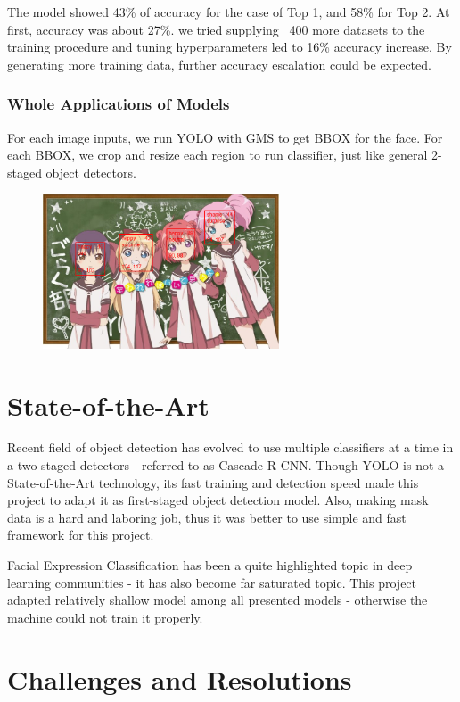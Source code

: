 \documentclass{article}
\begin{document}
The model showed 43\% of accuracy for the case of Top 1, and 58\% for Top 2. At
first, accuracy was about 27\%. we tried supplying ~400 more datasets to the
training procedure and tuning hyperparameters led to 16\% accuracy increase. By
generating more training data, further accuracy escalation could be expected.

\subsubsection{Whole Applications of Models}
For each image inputs, we run YOLO with GMS to get BBOX for the face. For each
BBOX, we crop and resize each region to run classifier, just like general
2-staged object detectors.

\begin{figure}[h]
  \centering
  \includegraphics[width=7cm]{image/yolo_class_example.png}
\end{figure}

\section{State-of-the-Art}
Recent field of object detection has evolved to use multiple classifiers at a
time in a two-staged detectors - referred to as Cascade
R-CNN\cite{DBLP:journals/corr/abs-1906-09756}. Though YOLO is not a
State-of-the-Art technology, its fast training and detection speed made this
project to adapt it as first-staged object detection model. Also, making mask
data is a hard and laboring job, thus it was better to use simple and fast
framework for this project.

Facial Expression Classification has been a quite highlighted topic in deep
learning communities - it has also become far saturated topic. This project
adapted relatively shallow model among all presented models - otherwise the
machine could not train it properly.

\section{Challenges and Resolutions}
\end{document}
